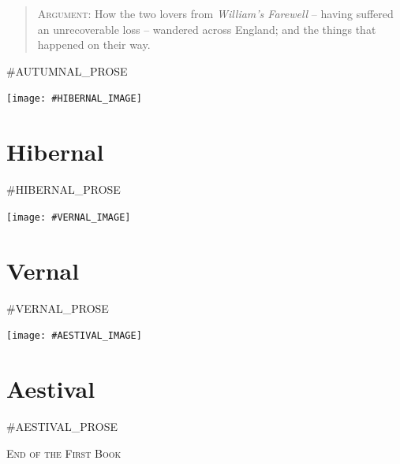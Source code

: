 \documentclass{amsbook}
\begin{document}
    \begin{quote}
        {\footnotesize \textsc{Argument:} How the two lovers from \textit{William's Farewell} -- having suffered an unrecoverable loss -- wandered across England; and the things that happened on their way.}
    \end{quote}
    \bigskip

    #AUTUMNAL_PROSE
    \clearpage

    \thispagestyle{empty}
    \vspace*{\fill}
    {\centering
    \texttt{[image: \#HIBERNAL\_IMAGE]}}
    \vspace*{\fill}
    \clearpage

    \chapter{Hibernal}

    \renewcommand{\poemone}{
        #HIBERNAL_POEM_1
    }
    \renewcommand{\poemtwo}{
        #HIBERNAL_POEM_2
    }
    \renewcommand{\poemthree}{
        #HIBERNAL_PRAYER
    }
    \initprintpoems

    #HIBERNAL_PROSE
    \clearpage

    \thispagestyle{empty}
    \vspace*{\fill}
    {\centering
    \texttt{[image: \#VERNAL\_IMAGE]}}
    \vspace*{\fill}
    \clearpage

    \chapter{Vernal}

    \renewcommand{\poemone}{
        #VERNAL_POEM_1
    }
    \renewcommand{\poemtwo}{
        #VERNAL_POEM_2
    }
    \renewcommand{\poemthree}{
        #VERNAL_PRAYER
    }
    \initprintpoems

    #VERNAL_PROSE
    \clearpage

    \thispagestyle{empty}
    \vspace*{\fill}
    {\centering
    \texttt{[image: \#AESTIVAL\_IMAGE]}}
    \vspace*{\fill}
    \clearpage

    \chapter{Aestival}

    \renewcommand{\poemone}{
        #AESTIVAL_POEM_1
    }
    \renewcommand{\poemtwo}{
        #AESTIVAL_POEM_2
    }
    \renewcommand{\poemthree}{
        #AESTIVAL_POEM_3
    }
    \initprintpoems

    #AESTIVAL_PROSE

    \bigskip
    \bigskip
    \begin{center}
        \textsc{End of the First Book}
    \end{center}
\end{document}
